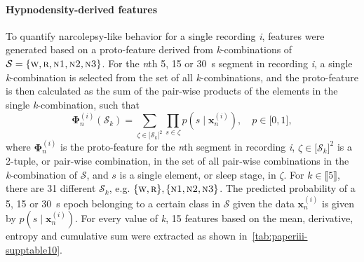 \paragraph{Hypnodensity-derived features}
To quantify narcolepsy-like behavior for a single recording \textit{i}, features were generated based on a proto-feature derived from \textit{k}-combinations of $\mathcal{S} = \lbrace \textsc{w}, \textsc{r}, \textsc{n1}, \textsc{n2}, \textsc{n3} \rbrace$. 
For the \textit{n}th \num{5}, \num{15} or \SI{30}{\second} segment in recording \textit{i}, a single \textit{k}-combination is selected from the set of all \textit{k}-combinations, and the proto-feature is then calculated as the sum of the pair-wise products of the elements in the single \textit{k}-combination, such that
\begin{equation}
    \boldsymbol{\Phi}^{(i)}_{n} \! \! \left( \mathcal{S}_{k} \right) = \sum_{\zeta \in \lbrack \mathcal{S}_{k} \rbrack^2} \prod_{s \in \zeta}{p\!\left( \! s \! \mid \! \mathbf{x}_{n}^{(i)} \! \right)}, \quad p \in \lbrack 0,1 \rbrack,
\end{equation}
where $\boldsymbol{\Phi}^{(i)}_{n}$ is the proto-feature for the \textit{n}th segment in recording \textit{i}, $\zeta \in \lbrack \mathcal{S}_{k} \rbrack^2$ is a \num{2}-tuple, or pair-wise combination, in the set of all pair-wise combinations in the \textit{k}-combination of $\mathcal{S}$, and $s$ is a single element, or sleep stage, in $\zeta$.
For $k \in \llbracket 5 \rrbracket$, there are 31 different $\mathcal{S}_k$, e.g. $\lbrace \textsc{w}, \textsc{r} \rbrace, \lbrace \textsc{n1}, \textsc{n2}, \textsc{n3} \rbrace$.
The predicted probability of a 5, 15 or \SI{30}{\second} epoch belonging to a certain class in $\mathcal{S}$ given the data $\mathbf{x}^{(i)}_n$ is given by \( p\!\left( \! s \! \mid \! \mathbf{x}_{n}^{(i)} \! \right) \).
For every value of \textit{k}, 15 features based on the mean, derivative, entropy and cumulative sum were extracted as shown in~\cref{tab:paperiii-supptable10}.

